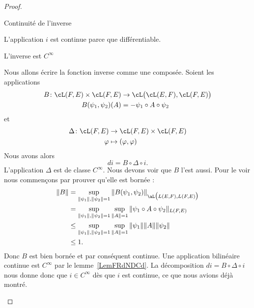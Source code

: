 \begin{proof}
\begin{subproof}
    \item[Continuité de l'inverse]

        L'application \( i\) est continue parce que différentiable.
    \item[L'inverse est \(  C^{\infty}\)]

        Nous allons écrire la fonction inverse comme une composée. Soient les applications
        \begin{equation}
            \begin{aligned}
                B\colon \cL(F,E)\times \cL(F,E)&\to \cL\big( \cL(E,F),\cL(F,E) \big) \\
                B(\psi_1,\psi_2)(A)&= -\psi_1\circ A\circ\psi_2
            \end{aligned}
        \end{equation}
        et
        \begin{equation}
            \begin{aligned}
                \Delta\colon \cL(F,E)&\to \cL(F,E)\times \cL(F,E) \\
                \varphi&\mapsto (\varphi,\varphi)
            \end{aligned}
        \end{equation}
        Nous avons alors
        \begin{equation}
            di=B\circ\Delta\circ i.
        \end{equation}
        L'application \( \Delta\) est de classe \(  C^{\infty}\). Nous devons voir que \( B\) l'est aussi. Pour le voir nous commençons par prouver qu'elle est bornée :
        \begin{equation}
            \begin{aligned}[]
                \| B \|&=\sup_{\| \psi_1 \|,\| \psi_2 \|=1}\| B(\psi_1,\psi_2) \|_{\aL\big( L(E,F),L(F,E) \big)}\\
                &=\sup_{  \| \psi_1 \|,\| \psi_2 \|=1 }\sup_{\| A \|=1}\| \psi_1\circ A\circ\psi_2 \|_{L(F,E)}\\
                &\leq \sup_{\| \psi_1 \|,\| \psi_2 \|=1}\sup_{\| A \|=1}\| \psi_1 \|\| A \|\| \psi_2 \|\\
                &\leq 1.
            \end{aligned}
        \end{equation}
        Donc \( B\) est bien bornée et par conséquent continue. Une application bilinéaire continue est \(  C^{\infty}\) par le lemme~\ref{LemFRdNDCd}. La décomposition \( di=B\circ \Delta\circ i\) nous donne donc que \( i\in C^{\infty}\) dès que \( i\) est continue, ce que nous avions déjà montré.
        \end{subproof}
\end{proof}


